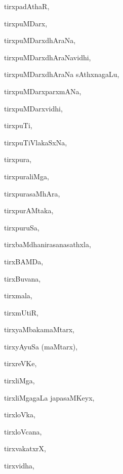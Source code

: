 \begin{multicols}{3}
{\noindent
{tirxpadAthaR}, \pageref{tirxpadAthaR}

\noindent
{tirxpuMDarx}, \pageref{tirxpuMDarx}

\noindent
{tirxpuMDarxdhAraNa}, \pageref{tirxpuMDarxdhAraNa}

\noindent
{tirxpuMDarxdhAraNavidhi}, \pageref{tirxpuMDarxdhAraNavidhi}

\noindent
{tirxpuMDarxdhAraNa sAthxna\-gaLu}, \pageref{tirxpuMDarxdhAraNa sAthxnagaLu}

\noindent
{tirxpuMDarxparxmANa}, \pageref{tirxpuMDarxparxmANa}

\noindent
{tirxpuMDarxvidhi}, \pageref{tirxpuMDarxvidhi}

\noindent
{tirxpuTi}, \pageref{tirxpuTi}

\noindent
{tirxpuTiVlakaSxNa}, \pageref{tirxpuTiVlakaSxNa}

\noindent
{tirxpura}, \pageref{tirxpura}

\noindent
{tirxpuraliMga}, \pageref{tirxpuraliMga}

\noindent
{tirxpurasaMhAra}, \pageref{tirxpurasaMhAra}

\noindent
{tirxpurAMtaka}, \pageref{tirxpurAMtaka}

\noindent
{tirxpuruSa}, \pageref{tirxpuruSa}

\noindent
{tirxbaMdhanirasanasathxla}, \pageref{tirxbaMdhanirasanasathxla}

\noindent
{tirxBAMDa}, \pageref{tirxBAMDa}

\noindent
{tirxBuvana}, \pageref{tirxBuvana}

\noindent
{tirxmala}, \pageref{tirxmala}

\noindent
{tirxmUtiR}, \pageref{tirxmUtiR}

\noindent
{tirxyaMbakamaMtarx}, \pageref{tirxyaMbakamaMtarx}

\noindent
{tirxyAyuSa (maMtarx)}, \pageref{tirxyAyuSa maMtarx}

\noindent
{tirxreVKe}, \pageref{tirxreVKe}

\noindent
{tirxliMga}, \pageref{tirxliMga}

\noindent
{tirxliMgagaLa japasaMKeyx}, \pageref{tirxliMgagaLa japasaMKeyx}

\noindent
{tirxloVka}, \pageref{tirxloVka}

\noindent
{tirxloVcana}, \pageref{tirxloVcana}

\noindent
{tirxvakatxrX}, \pageref{tirxvakatxrX}

\noindent
{tirxvidha}, \pageref{tirxvidha}

}
\end{multicols}

